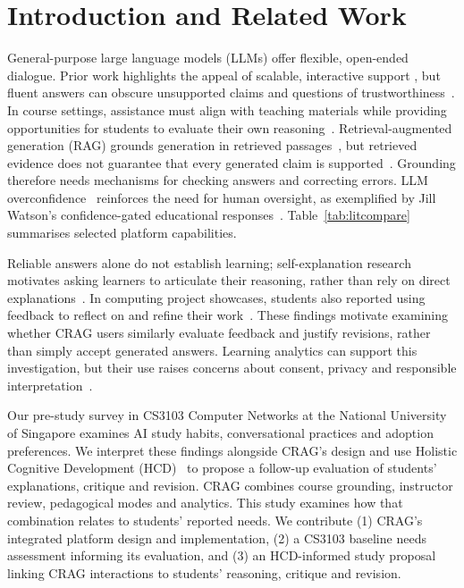 \documentclass[conference]{IEEEtran}
\begin{document}
\section{Introduction and Related Work}
General-purpose large language models (LLMs) offer flexible, open-ended dialogue. Prior work highlights the appeal of scalable, interactive support \cite{b_yayeh}, but fluent answers can obscure unsupported claims and questions of trustworthiness~\cite{b_bender,b_heersmink}. In course settings,
assistance must align with teaching materials while providing opportunities for students to evaluate their own reasoning~\cite{b_delikoura}.
Retrieval-augmented generation (RAG) grounds generation in retrieved passages~\cite{b_lewis}, but retrieved evidence does not guarantee that every generated claim is supported~\cite{b_gao_citations}. Grounding therefore needs mechanisms for checking answers and correcting errors. LLM overconfidence~\cite{b_xiong} reinforces the need for human oversight, as exemplified by Jill Watson's confidence-gated educational responses~\cite{b_jillwatson}. Table~\ref{tab:litcompare} summarises selected platform capabilities.

Reliable answers alone do not establish learning; self-explanation research motivates asking learners to articulate their reasoning, rather than rely on direct explanations~\cite{b_chi}. In computing project showcases, students also reported using feedback to reflect on and refine their work~\cite{b_steps}. These findings motivate examining whether CRAG users similarly evaluate feedback and justify revisions, rather than simply accept generated answers. Learning analytics can support this investigation, but their use raises concerns about consent, privacy and responsible interpretation~\cite{b_ferguson}.

Our pre-study survey in CS3103 Computer Networks at the National University of Singapore examines AI study habits, conversational practices and adoption preferences. We interpret these findings alongside CRAG's design and use Holistic Cognitive Development (HCD)~\cite{b_hcd1,b_hcd2} to propose a follow-up evaluation of students' explanations, critique and revision. CRAG combines course grounding, instructor review, pedagogical modes and analytics. This study examines how that combination relates to students' reported needs.
We contribute (1) CRAG's integrated platform design and implementation, (2) a CS3103 baseline needs assessment informing its evaluation, and (3) an HCD-informed study proposal linking CRAG interactions to students' reasoning, critique and revision.
\end{document}
